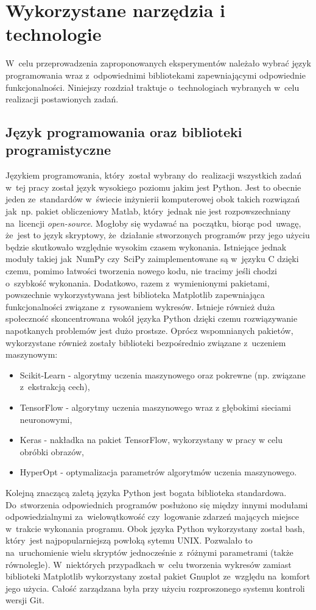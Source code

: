 \section{Wykorzystane narzędzia i technologie} \label{tools}
W~celu przeprowadzenia zaproponowanych eksperymentów należało wybrać język programowania wraz z~odpowiednimi bibliotekami zapewniającymi odpowiednie funkcjonalności. Niniejszy rozdział traktuje o~technologiach wybranych w~celu realizacji postawionych zadań.
\subsection{Język programowania oraz biblioteki programistyczne}
Językiem programowania, który~został wybrany do~realizacji wszystkich zadań w~tej pracy został język wysokiego poziomu jakim jest Python. Jest to obecnie jeden ze~standardów w~świecie inżynierii komputerowej obok takich rozwiązań jak~np. pakiet obliczeniowy Matlab, który~jednak nie jest rozpowszechniany na~licencji \textit{open-source}. Mogłoby się wydawać na~początku, biorąc pod~uwagę, że~jest to język skryptowy, że~działanie stworzonych programów przy jego użyciu będzie skutkowało względnie wysokim czasem wykonania. Istniejące jednak moduły takiej jak~NumPy czy~SciPy\cite{scipy} zaimplementowane są w~języku C dzięki czemu, pomimo łatwości tworzenia nowego kodu, nie tracimy jeśli chodzi o~szybkość wykonania. Dodatkowo, razem z~wymienionymi pakietami, powszechnie wykorzystywana jest biblioteka Matplotlib\cite{matplotlib} zapewniająca funkcjonalności związane z~rysowaniem wykresów. Istnieje również duża społeczność skoncentrowana wokół języka Python dzięki czemu rozwiązywanie napotkanych problemów jest dużo prostsze. Oprócz wspomnianych pakietów, wykorzystane również zostały biblioteki bezpośrednio związane z~uczeniem maszynowym:
\begin{itemize}
\item Scikit-Learn\cite{scikit} - algorytmy uczenia maszynowego oraz pokrewne (np. związane z~ekstrakcją cech),
\item TensorFlow\cite{tensorflow} - algorytmy uczenia maszynowego wraz z głębokimi sieciami neuronowymi,
\item Keras\cite{keras} - nakładka na pakiet TensorFlow, wykorzystany w pracy w celu obróbki obrazów,
\item HyperOpt\cite{hyperopt} - optymalizacja parametrów algorytmów uczenia maszynowego.
\end{itemize}
Kolejną znaczącą zaletą języka Python jest bogata biblioteka standardowa. Do~stworzenia odpowiednich programów posłużono się między innymi modułami odpowiedzialnymi za~wielowątkowość czy~logowanie zdarzeń mających miejsce w~trakcie wykonania programu. Obok języka Python wykorzystany został bash, który~jest najpopularniejszą powłoką sytemu UNIX. Pozwalało to na~uruchomienie wielu skryptów jednocześnie z~różnymi parametrami (także równolegle). W~niektórych przypadkach w~celu tworzenia wykresów zamiast biblioteki Matplotlib wykorzystany został pakiet Gnuplot ze~względu na~komfort jego użycia. Całość zarządzana była przy użyciu rozproszonego systemu kontroli wersji Git.

